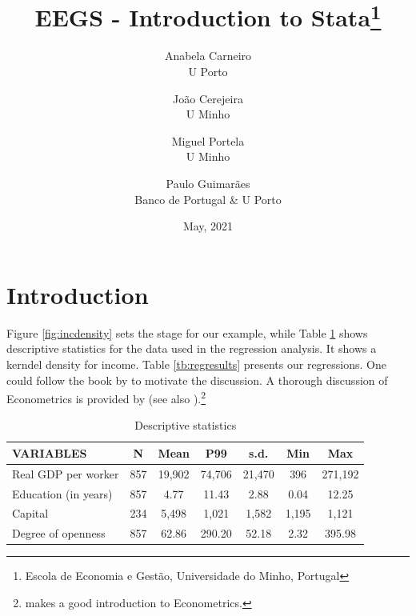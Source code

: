 \documentclass[a4paper,12pt]{article}
\title{EEGS - Introduction to Stata\thanks{Escola de Economia e Gestão, Universidade do Minho, Portugal}}
\date{May, 2021}
\author{Anabela Carneiro\\ U Porto
\and João Cerejeira \\ U Minho
\and Miguel Portela \\ U Minho 
\and Paulo Guimarães \\ Banco de Portugal \& U Porto}
\begin{document}
\maketitle

\section{Introduction}\label{sec:intro}

Figure \ref{fig:incdensity} sets the stage for our example, while Table \ref{tb:descriptives} shows descriptive statistics for the data used in the regression analysis. It shows a kerndel density for income. Table \ref{tb:regresults} presents our regressions. One could follow the book by \cite{acemoglu2016} to motivate the discussion. A thorough discussion of Econometrics is provided by \cite{greene2017} (see also \citep{verbeek2012}).\footnote{\cite{wooldridge2015introductory} makes a good introduction to Econometrics.}

\lipsum

\begin{table}[h]
\begin{center}
\caption{Descriptive statistics}\label{tb:descriptives}
\resizebox{0.9\textwidth}{!}
	{\begin{tabular}{lcccccc} \hline
VARIABLES & N & Mean & P99 & s.d. & Min & Max \\ \hline
Real GDP per worker & 857 & 19,902 & 74,706 & 21,470 & 396 & 271,192 \\
Education (in years) & 857 & 4.77 & 11.43 & 2.88 & 0.04 & 12.25 \\
Capital & 234 & 5,498 & 1,021 & 1,582 & 1,195 & 1,121 \\
Degree of openness & 857 & 62.86 & 290.20 & 52.18 & 2.32 & 395.98 \\ \hline
\end{tabular}}
\end{center}
\end{table}
\end{document}
